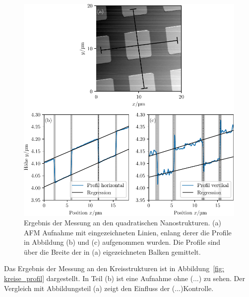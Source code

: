\begin{figure}
  \centering
  \includegraphics[scale = 1]{../analysis/data/nanostruktur_quadrate/quadrate_profile.pdf}
  \caption{Ergebnis der Messung an den quadratischen Nanostrukturen. (a) AFM Aufnahme mit eingezeichneten
  Linien, enlang derer die Profile in Abbildung (b) und (c) aufgenommen wurden. Die Profile sind
  über die Breite der in (a) eigezeichneten Balken gemittelt.}
  \label{fig: quadrate_profil}
\end{figure}

Das Ergebnis der Messung an den Kreisstrukturen ist in Abbildung~\ref{fig: kreise_profil} dargestellt. In Teil (b)
ist eine Aufnahme ohne (...) zu sehen. Der Vergleich mit Abbildungsteil (a) zeigt den Einfluss der (...)Kontrolle.



